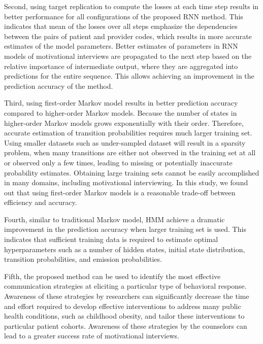 \documentclass{amia_summit_2018}
\begin{document}
Second, using target replication to compute the losses at each time step results in better performance for all configurations of the proposed RNN method. This indicates that mean of the losses over all steps emphasize the dependencies between the pairs of patient and provider codes, which results in more accurate estimates of the model parameters. Better estimates of parameters in RNN models of motivational interviews are propagated to the next step based on the relative importance of intermediate output, where they are aggregated into predictions for the entire sequence. This allows achieving an improvement in the prediction accuracy of the method. 

Third, using first-order Markov model results in better prediction accuracy compared to higher-order Markov models. Because the number of states in higher-order Markov models grows exponentially with their order. Therefore, accurate estimation of transition probabilities requires much larger training set. Using smaller datasets such as under-sampled dataset will result in a sparsity problem, when many transitions are either not observed in the training set at all or observed only a few times, leading to missing or potentially inaccurate probability estimates. Obtaining large training sets cannot be easily accomplished in many domains, including motivational interviewing. In this study, we found out that using first-order Markov models is a reasonable trade-off between efficiency and accuracy.  

Fourth, similar to traditional Markov model, HMM achieve a dramatic improvement in the prediction accuracy when larger training set is used. This indicates that sufficient training data is required to estimate optimal hyperparameters such as a number of hidden states, initial state distribution, transition probabilities, and emission probabilities.   
 
Fifth, the proposed method can be used to identify the most effective communication strategies at eliciting a particular type of behavioral response. Awareness of these strategies by researchers can significantly decrease the time and effort required to develop effective interventions to address many public health conditions, such as childhood obesity, and tailor these interventions to particular patient cohorts. Awareness of these strategies by the counselors can lead to a greater success rate of motivational interviews.     
 
\end{document}
